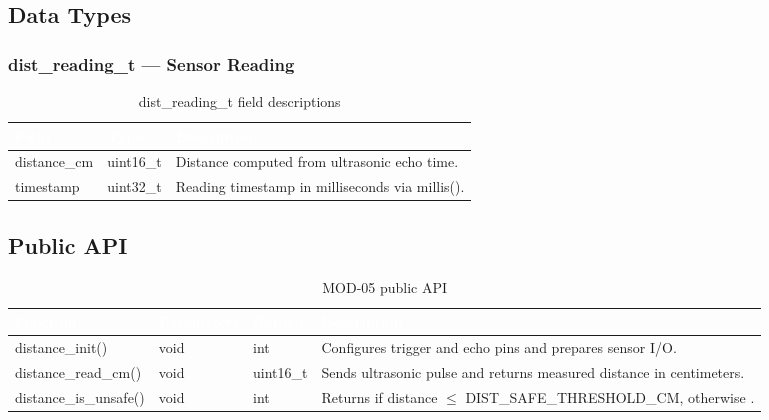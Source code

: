 \documentclass[12pt,a4paper]{article}
\newcommand{\theadtext}[1]{\textcolor{white}{\textbf{#1}}}
\newcommand{\fn}[1]{{\footnotesize\ttfamily #1}}
\begin{document}
\subsection{Data Types}

\subsubsection{\fn{dist\_reading\_t} --- Sensor Reading}

\begin{table}[H]
\centering\small
\begin{tabularx}{\textwidth}{L{4cm} L{2.5cm} X}
\toprule
{}
\theadtext{Field} & \theadtext{Type} & \theadtext{Description} \\
\midrule
{}   \fn{distance\_cm} & \fn{uint16\_t} & Distance computed from ultrasonic echo time. \\
 \fn{timestamp}    & \fn{uint32\_t} & Reading timestamp in milliseconds via \fn{millis()}. \\
\bottomrule
\end{tabularx}
\caption{\fn{dist\_reading\_t} field descriptions}
\end{table}

\subsection{Public API}

\begin{table}[H]
\centering\small
\begin{tabularx}{\textwidth}{L{4.5cm} L{2.5cm} L{2.5cm} X}
\toprule
{}
\theadtext{Function} & \theadtext{Parameters} & \theadtext{Return} & \theadtext{Description} \\
\midrule
{}   \fn{distance\_init()}      & \fn{void} & \fn{int}        & Configures trigger and echo pins and prepares sensor I/O. \\
 \fn{distance\_read\_cm()}  & \fn{void} & \fn{uint16\_t}  & Sends ultrasonic pulse and returns measured distance in centimeters. \\
   \fn{distance\_is\_unsafe()} & \fn{void} & \fn{int}        & Returns \fn{1} if distance $\leq$ \fn{DIST\_SAFE\_THRESHOLD\_CM}, otherwise \fn{0}. \\
\bottomrule
\end{tabularx}
\caption{MOD-05 public API}
\end{table}
\end{document}
